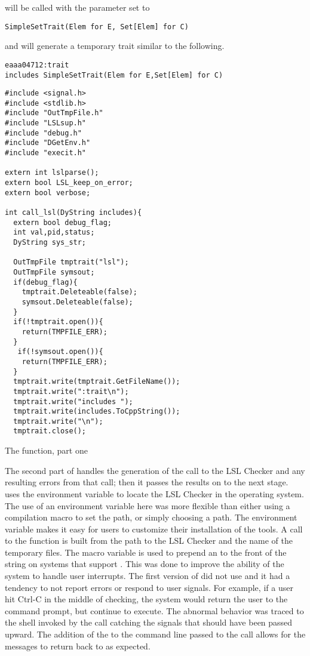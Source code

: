  will be called with the 
parameter set to
\begin{verbatim}
SimpleSetTrait(Elem for E, Set[Elem] for C)
\end{verbatim}
and will generate a temporary trait similar to the following.
\begin{verbatim}
eaaa04712:trait
includes SimpleSetTrait(Elem for E,Set[Elem] for C)
\end{verbatim}

\begin{BFIGURE}
\begin{verbatim}
#include <signal.h>
#include <stdlib.h>
#include "OutTmpFile.h"
#include "LSLsup.h"
#include "debug.h"
#include "DGetEnv.h"
#include "execit.h"

extern int lslparse();
extern bool LSL_keep_on_error;
extern bool verbose;

int call_lsl(DyString includes){
  extern bool debug_flag;
  int val,pid,status;
  DyString sys_str;
  
  OutTmpFile tmptrait("lsl");
  OutTmpFile symsout;
  if(debug_flag){
    tmptrait.Deleteable(false);
    symsout.Deleteable(false);
  }
  if(!tmptrait.open()){
    return(TMPFILE_ERR);
  }
   if(!symsout.open()){
    return(TMPFILE_ERR);
  }
  tmptrait.write(tmptrait.GetFileName());
  tmptrait.write(":trait\n");
  tmptrait.write("includes ");
  tmptrait.write(includes.ToCppString());
  tmptrait.write("\n");
  tmptrait.close();
\end{verbatim}
\caption{The  function, part one}
\label{calllsl1}
\end{BFIGURE}

The second part of  handles the generation of the
call to the LSL Checker and any resulting errors from that call; then it
passes the results on to the next stage.  uses 
the environment variable  to locate the LSL
Checker in the operating system. The use of an environment variable here was
more flexible than either using a compilation macro to set the path,
or simply choosing a path. The environment variable makes it easy for
users to customize their installation of the tools. A call to the
 function is built from the path to the LSL
Checker and  the name of the temporary files. The macro variable
 is used to prepend an  to the front of the
string on systems that support . This was done to improve the
ability of the system to handle user interrupts. The first version of
 did not use  and it had a tendency to not
report errors or respond to user signals. For example, if a user hit
Ctrl-C in the middle of checking, the system would return the user to
the command prompt, but continue to execute. The abnormal behavior was
traced to the shell invoked by the  call catching the signals
that should have been passed upward. The addition of the  to
the command line passed to the  call allows for the messages
to return back to  as expected. 

